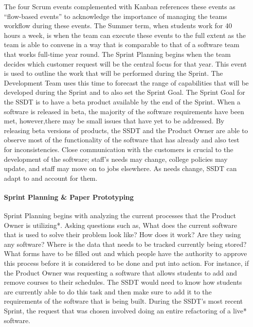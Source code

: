 The four Scrum events complemented with Kanban references these events as ``flow-based events'' to acknowledge the importance of managing the teams workflow during these events. The Summer term, when students work for 40 hours a week, is when the team can execute these events to the full extent as the team is able to convene in a way that is comparable to that of a software team that works full-time year round. The Sprint Planning begins when the team decides which customer request will be the central focus for that year. This event is used to outline the work that will be performed during the Sprint. The Development Team uses this time to forecast the range of capabilities that will be developed during the Sprint and to also set the Sprint Goal. The Sprint Goal for the SSDT is to have a beta product available by the end of the Sprint.  When a software is released in beta, the majority of the software requirements have been met, however,there may be small issues that have yet to be addressed.  By releasing beta versions of products, the SSDT and the Product Owner are able to observe most of the functionality of the software that has already and also test for inconsistencies. Close communication with the customers is crucial to the development of the software; staff's needs may change, college policies may update, and staff may move on to jobs elsewhere. As needs change, SSDT can adapt to and account for them.



\paragraph{Sprint Planning \& Paper Prototyping}
Sprint Planning begins with analyzing the current processes that the Product Owner is utilizing*. Asking questions such as, What does the current software that is used to solve their problem look like? How does it work? Are they using any software? Where is the data that needs to be tracked currently being stored? What forms have to be filled out and which people have the authority to approve this process before it is considered to be done and put into action. For instance, if the Product Owner was requesting a software that allows students to add and remove courses to their schedules. The SSDT would need to know how students are currently able to do this task and then make sure to add it to the requirements of the software that is being built. During the SSDT's most recent Sprint, the request that was chosen involved doing an entire refactoring of a live* software.

